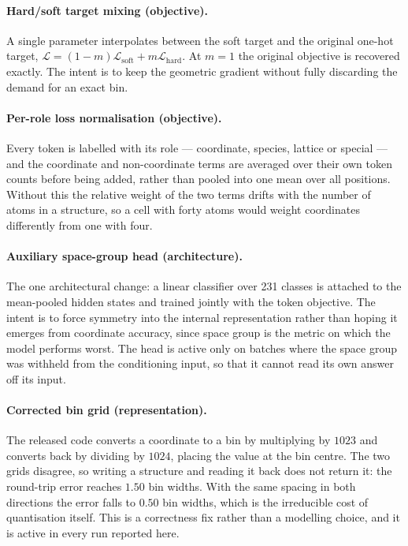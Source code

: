 \documentclass[manuscript,screen,review]{acmart}
\begin{document}
\paragraph{Hard/soft target mixing (objective).}
A single parameter interpolates between the soft target and the original one-hot
target, $\mathcal{L} = (1-m)\mathcal{L}_{\mathrm{soft}} +
m\mathcal{L}_{\mathrm{hard}}$. At $m = 1$ the original objective is recovered
exactly. The intent is to keep the geometric gradient without fully discarding
the demand for an exact bin.

\paragraph{Per-role loss normalisation (objective).}
Every token is labelled with its role --- coordinate, species, lattice or
special --- and the coordinate and non-coordinate terms are averaged over their
own token counts before being added, rather than pooled into one mean over all
positions. Without this the relative weight of the two terms drifts with the
number of atoms in a structure, so a cell with forty atoms would weight
coordinates differently from one with four.

\paragraph{Auxiliary space-group head (architecture).}
The one architectural change: a linear classifier over 231 classes is attached
to the mean-pooled hidden states and trained jointly with the token objective.
The intent is to force symmetry into the internal representation rather than
hoping it emerges from coordinate accuracy, since space group is the metric on
which the model performs worst. The head is active only on batches where the
space group was withheld from the conditioning input, so that it cannot read its
own answer off its input.

\paragraph{Corrected bin grid (representation).}
The released code converts a coordinate to a bin by multiplying by $1023$ and
converts back by dividing by $1024$, placing the value at the bin centre. The
two grids disagree, so writing a structure and reading it back does not return
it: the round-trip error reaches $1.50$ bin widths. With the same spacing in
both directions the error falls to $0.50$ bin widths, which is the irreducible
cost of quantisation itself. This is a correctness fix rather than a modelling
choice, and it is active in every run reported here.
\end{document}
